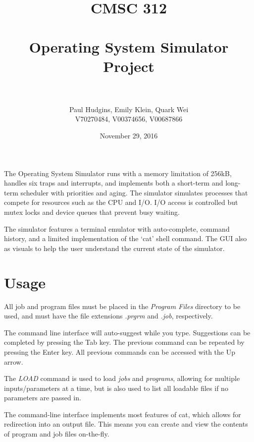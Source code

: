 \documentclass[paper=a4, fontsize=11pt]{scrartcl} %
\title{	
\normalfont \normalsize 
\textsc{CMSC 312} \\ [25pt] %
\horrule{0.5pt} \\[0.4cm] %
\huge Operating System Simulator Project \\ %
\horrule{2pt} \\[0.5cm] %
}
\author{Paul Hudgins, Emily Klein, Quark Wei%
\\ \normalsize V70270484, V00374656, V00687866}
\date{\normalsize November 29, 2016}%
\numberwithin{equation}{section} %
\numberwithin{figure}{section} %
\numberwithin{table}{section} %
\begin{document}
\maketitle %


The Operating System Simulator runs with a memory limitation of 256kB, handles six traps and interrupts, and implements both a short-term and long-term scheduler with priorities and aging. The simulator simulates processes that compete for resources such as the CPU and I/O. I/O access is controlled but mutex locks and device queues that prevent busy waiting.

 The simulator features a terminal emulator with auto-complete, command history, and a limited implementation of the `cat' shell command. The GUI also as visuals to help the user understand the current state of the simulator.

\section{Usage}

 All job and program files must be placed in the \textit{Program Files} directory to be used, and must have the file extensions \textit{.prgrm} and \textit{.job}, respectively.

The command line interface will auto-suggest while you type. Suggestions can be completed by pressing the Tab key. The previous command can be repeated by pressing the Enter key. All previous commands can be accessed with the Up arrow.

The \textit{LOAD} command is used to load \textit{jobs} and \textit{programs}, allowing for multiple inputs/parameters at a time, but is also used to list all loadable files if no parameters are passed in.

The command-line interface implements most features of cat, which allows for redirection into an output file. This means you can create and view the contents of program and job files on-the-fly.
\end{document}
